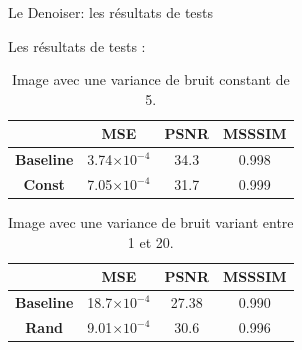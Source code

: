 \documentclass[11pt]{beamer}
\begin{document}
\begin{frame}{Le Denoiser: les résultats de tests}

    Les résultats de tests :
    \begin{table}
        \centering
        \begin{tabular}{|c|c|c|c|}
            \hline
             & MSE & PSNR & MSSSIM \\
             \hline
            \textbf{Baseline} & 3.74$\times 10^{-4}$ & 34.3 & 0.998\\
            \textbf{Const} & 7.05$\times 10^{-4}$ & 31.7 & 0.999 \\
            \hline
        \end{tabular}
        \caption{Image avec une variance de bruit constant de 5.}
    \end{table}

    \begin{table}
        \centering
        \begin{tabular}{|c|c|c|c|}
            \hline
             & MSE & PSNR & MSSSIM \\
             \hline
            \textbf{Baseline} & 18.7$\times 10^{-4}$ & 27.38 & 0.990\\
            \textbf{Rand} & 9.01$\times 10^{-4}$ & 30.6 & 0.996 \\
            \hline
        \end{tabular}
        \caption{Image avec une variance de bruit variant entre 1 et 20.}
    \end{table}
\end{frame}
\end{document}
